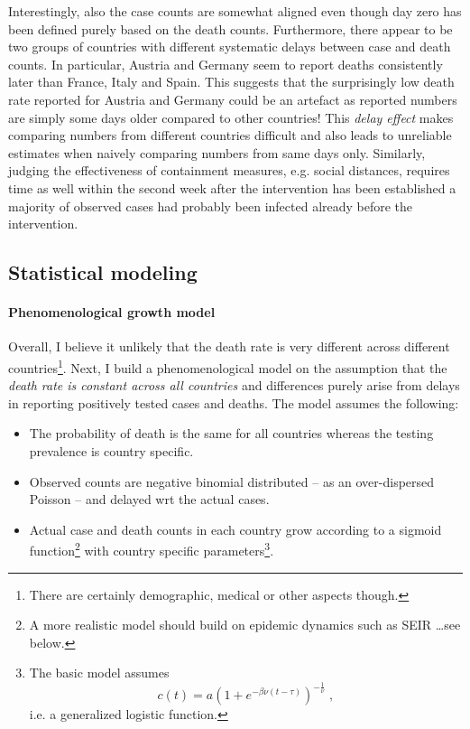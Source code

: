 \documentclass[a4paper]{tufte-handout}
\begin{document}
Interestingly, also the case counts are somewhat aligned even though
day zero has been defined purely based on the death
counts. Furthermore, there appear to be two groups of countries with
different systematic delays between case and death counts. In
particular, Austria and Germany seem to report deaths consistently
later than France, Italy and Spain. This suggests that the
surprisingly low death rate reported for Austria and Germany could be
an artefact as reported numbers are simply some days older compared to
other countries! This {\em delay effect} makes comparing numbers from
different countries difficult and also leads to unreliable estimates
when naively comparing numbers from same days only. Similarly, judging
the effectiveness of containment measures, e.g. social distances,
requires time as well within the second week after the intervention
has been established a majority of observed cases had probably been
infected already before the intervention.

\subsection{Statistical modeling}

\paragraph{Phenomenological growth model}
Overall, I believe it unlikely that the death rate is very different
across different countries\footnote{There are certainly demographic,
  medical or other aspects though.}. Next, I build a phenomenological
model on the assumption that the {\em death rate is constant across
  all countries} and differences purely arise from delays in reporting
positively tested cases and deaths. The model assumes the following:
\begin{itemize}
\item The probability of death is the same for all countries whereas
  the testing prevalence is country specific.
\item Observed counts are negative binomial distributed -- as an
  over-dispersed Poisson -- and delayed wrt the actual cases.
\item Actual case and death counts in each country grow according to a
  sigmoid function\footnote{A more realistic model should build on
    epidemic dynamics such as SEIR \ldots see below.} with country
  specific parameters\footnote{The basic model assumes \[ c(t) = a (1
    + e^{- \beta \nu (t - \tau)})^{- \frac{1}{\nu}} \; , \] i.e. a
    generalized logistic function.}.
\end{itemize}
\end{document}
